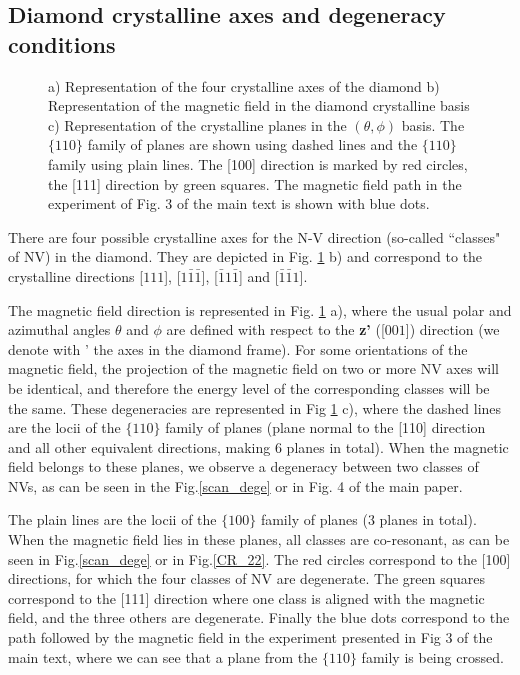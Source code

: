 \documentclass[preprintnumbers,amsmath,amssymb,onecolumn,12pt]{revtex4}
\begin{document}
\subsection{Diamond crystalline axes and degeneracy conditions}
\begin{figure}[!ht]
  \centering {}
  \caption{a) Representation of the four crystalline axes of the diamond b) Representation of the magnetic field in the diamond crystalline basis c) Representation of the crystalline planes in the $(\theta , \phi)$ basis. The $\{ 110 \}$ family of planes are shown using dashed lines and the $\{ 110 \}$ family using plain lines. The [100] direction is marked by red circles, the [111] direction by green squares. The magnetic field path in the experiment of Fig. 3 of the main text is shown with blue dots.}
	\label{cristallo}
\end{figure}
There are four possible crystalline axes for the N-V direction (so-called ``classes" of NV) in the diamond. They are depicted in Fig. \ref{cristallo} b) and correspond to the crystalline directions [$111$], [$1\bar 1 \bar 1$], [$\bar 1 1 \bar 1$] and [$\bar 1 \bar 1 1$]. 

The magnetic field direction is represented in Fig. \ref{cristallo} a), where the usual polar and azimuthal angles $\theta$ and $\phi$ are defined with respect to the \textbf{z'} ([$001$]) direction (we denote with ' the axes in the diamond frame). For some orientations of the magnetic field, the projection of the magnetic field on two or more NV axes will be identical, and therefore the energy level of the corresponding classes will be the same. These degeneracies are represented in Fig \ref{cristallo} c), where the dashed lines are the locii of the $\{ 110 \}$ family of planes (plane normal to the [110] direction and all other equivalent directions, making 6 planes in total). When the magnetic field belongs to these planes, we observe a degeneracy between two classes of NVs, as can be seen in the Fig.\ref{scan_dege} or in Fig. 4 of the main paper.

The plain lines are the locii of the $\{ 100 \}$ family of planes (3 planes in total). When the magnetic field lies in these planes, all classes are co-resonant, as can be seen in Fig.\ref{scan_dege} or in Fig.\ref{CR_22}.
The red circles correspond to the [100] directions, for which the four classes of NV are degenerate. The green squares correspond to the [111] direction where one class is aligned with the magnetic field, and the three others are degenerate. Finally the blue dots correspond to the path followed by the magnetic field in the experiment presented in Fig 3 of the main text, where we can see that a plane from the $\{ 110 \}$ family is being crossed.
\end{document}
